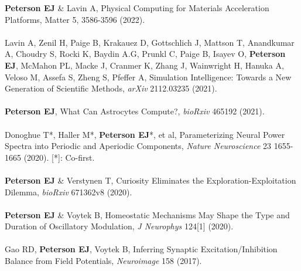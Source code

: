 \documentclass[margin,line]{res}
\begin{document}
\begin{resume}
\textbf{Peterson EJ} \& Lavin A, Physical Computing for Materials Acceleration Platforms, Matter 5, 3586-3596 (2022).
\\ 
\vspace{-.35cm} 
\\
Lavin A, Zenil H, Paige B, Krakauez D, Gottschlich J, Mattson T, Anandkumar A, Choudry S, Rocki K, Baydin A.G, Prunkl C, Paige B, Isayev O, \textbf{Peterson EJ}, McMahon PL, Macke J, Cranmer K, Zhang J, Wainwright H, Hanuka A, Veloso M, Assefa S, Zheng S, Pfeffer A, Simulation Intelligence: Towards a New Generation of Scientific Methods, \emph{arXiv} 2112.03235 (2021).
\\ 
\vspace{-.35cm} 
\\
\textbf{Peterson EJ}, What Can Astrocytes Compute?, \emph{bioRxiv} 465192 (2021).
\\ 
\vspace{-.35cm} 
\\
Donoghue T*, Haller M*, \textbf{Peterson EJ}*, et al, Parameterizing Neural Power Spectra into Periodic and Aperiodic Components, \emph{Nature Neuroscience} 23 1655-1665 (2020). [*]: Co-first. 
\\ 
\vspace{-.35cm} 
\\
\textbf{Peterson EJ} \& Verstynen T, Curiosity Eliminates the Exploration-Exploitation Dilemma, \emph{bioRxiv} 671362v8 (2020). 
\\ 
\vspace{-.35cm} 
\\
\textbf{Peterson EJ} \& Voytek B, Homeostatic Mechanisms May Shape the Type and Duration of Oscillatory Modulation, \emph{J Neurophys} 124[1] (2020).
\\ 
\vspace{-.35cm} 
\\
Gao RD, \textbf{Peterson EJ}, Voytek B, Inferring Synaptic Excitation/Inhibition Balance from Field Potentials, \emph{Neuroimage} 158 (2017).

\end{resume}
\end{document}
